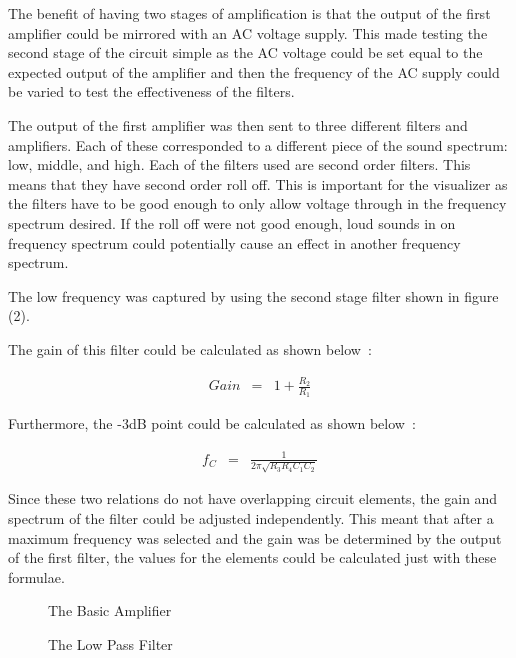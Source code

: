 \documentclass{article}
\begin{document}
The benefit of having two stages of amplification is that the output of the first amplifier could be mirrored with an AC voltage supply. This made testing the second stage of the circuit simple as the AC voltage could be set equal to the expected output of the amplifier and then the frequency of the AC supply could be varied to test the effectiveness of the filters. 

The output of the first amplifier was then sent to three different filters and amplifiers. Each of these corresponded to a different piece of the sound spectrum: low, middle, and high. Each of the filters used are second order filters. This means that they have second order roll off. This is important for the visualizer as the filters have to be good enough to only allow voltage through in the frequency spectrum desired. If the roll off were not good enough, loud sounds in on frequency spectrum could potentially cause an effect in another frequency spectrum. 

The low frequency was captured by using the second stage filter shown in figure (2).~\cite{Low}

The gain of this filter could be calculated as shown below~\cite{Low}:

\begin{eqnarray}
Gain &=& 1 + \frac{R_2}{R_1} 
\end{eqnarray}

Furthermore, the -3dB point could be calculated as shown below~\cite{Low}:

\begin{eqnarray}
f_C &=& \frac{1}{2\pi \sqrt{R_3R_4C_1C_2}}
\end{eqnarray}

Since these two relations do not have overlapping circuit elements, the gain and spectrum of the filter could be adjusted independently. This meant that after a maximum frequency was selected and the gain was be determined by the output of the first filter, the values for the elements could be calculated just with these formulae. 

\begin{figure}[t]

\begin{minipage}[b]{1.0\linewidth}
  \centering
  \centerline{}
\caption{The Basic Amplifier}
\end{minipage}
\begin{minipage}[b]{1.0\linewidth}
  \centering
  \centerline{}
\caption{The Low Pass Filter}
\end{minipage}
\end{figure}
\end{document}
